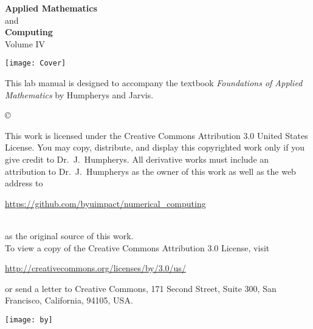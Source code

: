 \documentclass[nociteref]{SIAM-GH-book}
\begin{document}
\thispagestyle{empty}
\begin{center}
{\huge \bf Applied Mathematics} \\ and \\ {\huge \bf Computing} \\
\vspace{5mm}
{\Large Volume IV}
\vspace{20mm}

\texttt{[image: Cover]}
\end{center}
\frontmatter




\begin{thepreface}
This lab manual is designed to accompany the textbook \emph{Foundations of Applied Mathematics} by Humpherys and Jarvis.

\vfill
\copyright{This work is licensed under the Creative Commons Attribution 3.0 United States 
License.  You may copy, distribute, and display this copyrighted work only if you give 
credit to Dr.~J.~Humpherys. All derivative works must include an attribution to Dr.~J.~Humpherys as the owner of this work as well as the web address to 
\\\centerline{\url{https://github.com/byuimpact/numerical_computing}}\\ as the original source of 
this 
work.\\To view a copy of the Creative Commons Attribution 3.0 License, 
visit\\\centerline{\url{http://creativecommons.org/licenses/by/3.0/us/}} or send a letter to 
Creative Commons, 171 Second Street, Suite 300, San Francisco, California, 94105, USA.}

\vfill
\centering\texttt{[image: by]}
\vfill
\end{thepreface}

\setcounter{tocdepth}{1}
\tableofcontents

\mainmatter
\end{document}

